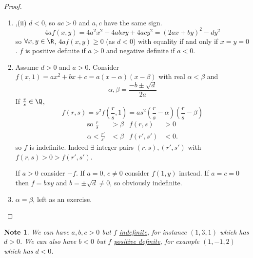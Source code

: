 \documentclass{article}
\newtheorem*{note}{Note}
\begin{document}
\begin{proof}
    \begin{enumerate}[label=(\roman*)]
        \item,(ii) $d < 0$, so $ac > 0$ and $a,c$ have the same sign.
            \begin{equation*}
                4a f(x, y) = 4 a^2 x^2 + 4 a b x y + 4 a c y^2 = (2ax+by)^2 - dy^2
            \end{equation*}
            so $\forall x, y \in \R$, $4a f(x, y) \geq 0$ (as $d < 0$) with equality if and only if $x = y = 0$.
            $f$ is positive definite if $a > 0$ and negative definite if $a < 0$.
        \setcounter{enumi}{2}
    \item Assume $d > 0$ and $a > 0$.
        Consider $f(x, 1) = a x^2 + b x + c = a(x - \alpha)(x - \beta)$ with real $\alpha < \beta$ and
        \begin{equation}
            \alpha, \beta = \frac{-b \pm \sqrt{d}}{2a}
        \end{equation}
        If $\frac{r}{s} \in \Q$,
        \begin{equation*}
            f(r, s) = s^2 f(\frac{r}{s}, 1) = a s^2 (\frac{r}{s} - \alpha)(\frac{r}{s} - \beta)
        \end{equation*}
        \begin{align*}
            \text{so } \frac{r}{s} &> \beta & f(r, s) &> 0 \\
            \alpha < \frac{r'}{s'} &< \beta & f(r', s') &< 0.
        \end{align*}
        so $f$ is indefinite.
        Indeed $\exists$ integer pairs $(r, s), (r', s')$ with $f(r, s) > 0 > f(r', s')$.

        If $a > 0$ consider $-f$. If $a = 0$, $c \neq 0$ consider $f(1, y)$ instead.
        If $a=c=0$ then $f = b xy$ and $b = \pm \sqrt{d} \neq 0$, so obviously indefinite.
    \item $\alpha = \beta$, left as an exercise.
    \end{enumerate}
\end{proof}

\begin{note}
    We can have $a, b, c > 0$ but $f$ \hyperlink{def:definite}{indefinite}, for instance $(1, 3, 1)$ which has $d > 0$.
    We can also have $b < 0$ but $f$ \hyperlink{def:definite}{positive definite}, for example $(1, -1, 2)$ which has $d < 0$.
\end{note}
\end{document}
